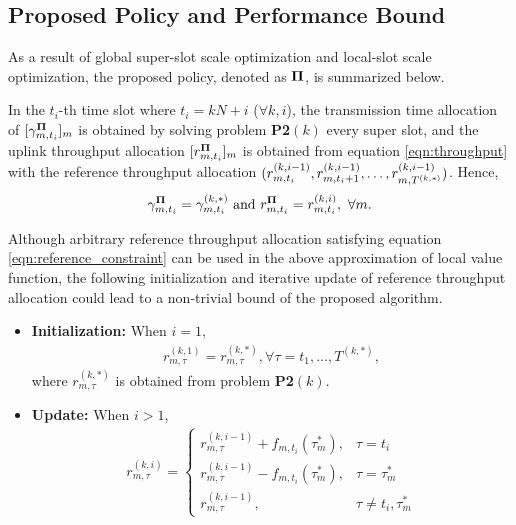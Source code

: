 \subsection{Proposed Policy and Performance Bound}
As a result of global super-slot scale optimization and local-slot scale optimization, the proposed policy, denoted as $\mathbf{\Pi}$, is summarized below.
\begin{definition}
    \label{def:baseline}
    In the $t_i$-th time slot where $t_i=kN+i$ ($\forall k,i$),
    the transmission time allocation of {\IAVs} $[ \gamma^{\mathbf{\Pi}}_{m,t_i}]_m$ is obtained by solving problem \textbf{P2$(k)$} every super slot, and the uplink throughput allocation $[ r^{\mathbf{\Pi}}_{m,t_i}]_m$ is obtained from equation \eqref{eqn:throughput} with the reference throughput allocation
    $( r^{(k,i-1)}_{m,t_i}, r^{(k,i-1)}_{m,t_i+1}, \dots, r^{(k,i-1)}_{m,T^{(k,*)}} )$.
    Hence,  $$\gamma^{\mathbf{\Pi}}_{m,t_i}=\gamma^{(k,*)}_{m,t_i} \mbox{ and } r^{\mathbf{\Pi}}_{m,t_i} = r^{(k,i)}_{m,t_i}, \ \forall m.$$
\end{definition}

Although arbitrary reference throughput allocation satisfying equation \eqref{eqn:reference_constraint} can be used in the above approximation of local value function, the following initialization and iterative update of reference throughput allocation could lead to a non-trivial bound of the proposed algorithm. 
\begin{itemize}
    \item {\bf Initialization:} When $i=1$, 
    \begin{align}
        r^{(k,1)}_{m,\tau} = r^{(k,*)}_{m,\tau}, \forall \tau = t_{1}, \dots, T^{(k,*)}\nonumber,
    \end{align}
    where $r^{(k,*)}_{m,\tau}$ is obtained from problem {\bf P2}$(k)$.
    \item {\bf Update:} When $i>1$,
    \begin{align}
    r^{(k,i)}_{m,\tau} = 
    \begin{cases}
        r^{(k,i-1)}_{m,\tau} + f_{m,t_{i}}(\tau_m^*), &\tau=t_i
        \\
        r^{(k,i-1)}_{m,\tau} - f_{m,t_{i}}(\tau_m^*), &\tau=\tau^*_{m}
        \\
        r^{(k,i-1)}_{m,\tau}, &\tau \neq t_i, \tau^*_{m}
    \end{cases}
    \label{eqn:approx_solution}
\end{align}
\end{itemize}

